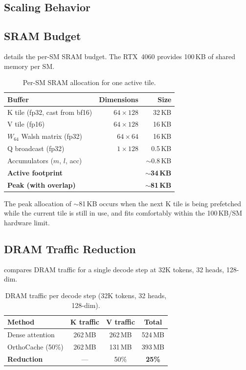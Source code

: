 \documentclass[conference]{IEEEtran}
\begin{document}
\subsection{Scaling Behavior}


\subsection{SRAM Budget}

 details the per-SM SRAM budget. The RTX~4060
provides 100\,KB of shared memory per SM.

\begin{table}[h]
\centering
\caption{Per-SM SRAM allocation for one active tile.}
\label{tab:sram}
\begin{tabular}{@{}lrr@{}}
\toprule
Buffer & Dimensions & Size \\
\midrule
K tile (fp32, cast from bf16) & $64 \times 128$ & 32\,KB \\
V tile (fp16)                 & $64 \times 128$ & 16\,KB \\
$W_{64}$ Walsh matrix (fp32)  & $64 \times 64$  & 16\,KB \\
Q broadcast (fp32)            & $1 \times 128$  & 0.5\,KB \\
Accumulators ($m$, $l$, acc)  &                 & $\sim$0.8\,KB \\
\midrule
\textbf{Active footprint}     &                 & $\sim$\textbf{34\,KB} \\
\textbf{Peak (with overlap)}  &                 & $\sim$\textbf{81\,KB} \\
\bottomrule
\end{tabular}
\end{table}

The peak allocation of $\sim$81\,KB occurs when the next K tile is
being prefetched while the current tile is still in use, and fits
comfortably within the 100\,KB/SM hardware limit.

\subsection{DRAM Traffic Reduction}

 compares DRAM traffic for a single decode step at
32K tokens, 32 heads, 128-dim.

\begin{table}[h]
\centering
\caption{DRAM traffic per decode step (32K tokens, 32 heads, 128-dim).}
\label{tab:dram}
\begin{tabular}{@{}lccc@{}}
\toprule
Method & K traffic & V traffic & Total \\
\midrule
Dense attention   & 262\,MB & 262\,MB & 524\,MB \\
OrthoCache (50\%) & 262\,MB & 131\,MB & 393\,MB \\
\midrule
\textbf{Reduction} & --- & 50\% & \textbf{25\%} \\
\bottomrule
\end{tabular}
\end{table}
\end{document}
